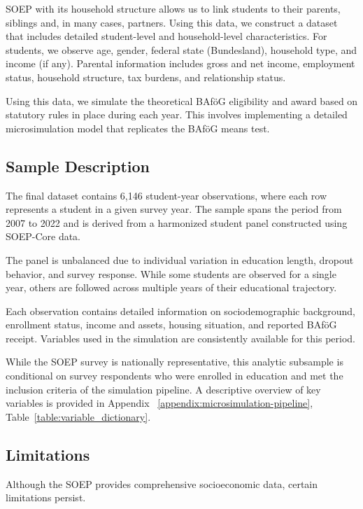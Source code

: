 SOEP with its household structure allows us to link students to their parents, siblings and, in many cases, partners.
Using this data, we construct a dataset that includes detailed student-level and household-level characteristics. 
For students, we observe age, gender, federal state (Bundesland), household type, and income (if any). 
Parental information includes gross and net income, employment status, household structure, tax burdens, and relationship status. 

Using this data, we simulate the theoretical BAföG eligibility and award based on statutory rules in place during each year. 
This involves implementing a detailed microsimulation model that replicates the BAföG means test.

\subsection{Sample Description}
The final dataset contains 6,146 student-year observations, where each row represents a student in a given survey year. 
The sample spans the period from 2007 to 2022 and is derived from a harmonized student panel constructed using SOEP-Core data.

The panel is unbalanced due to individual variation in education length, dropout behavior, and survey response. 
While some students are observed for a single year, others are followed across multiple years of their educational trajectory.

Each observation contains detailed information on sociodemographic background, enrollment status, income and assets, housing situation, and reported BAföG receipt. Variables used in the simulation are consistently available for this period.

While the SOEP survey is nationally representative, this analytic subsample is conditional on survey respondents who were enrolled in education and met the inclusion criteria of the simulation pipeline. 
A descriptive overview of key variables is provided in Appendix ~\ref{appendix:microsimulation-pipeline}, Table~\ref{table:variable_dictionary}.

\subsection{Limitations}

Although the SOEP provides comprehensive socioeconomic data, certain limitations persist.


